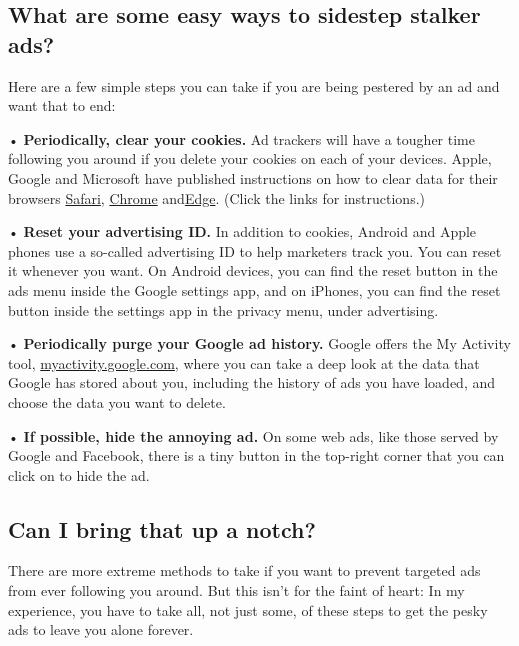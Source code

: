 \hypertarget{what-are-some-easy-ways-to-sidestep-stalker-ads}{%
\subsection{What are some easy ways to sidestep stalker
ads?}\label{what-are-some-easy-ways-to-sidestep-stalker-ads}}

Here are a few simple steps you can take if you are being pestered by an
ad and want that to end:

• \textbf{Periodically, clear your cookies.} Ad trackers will have a
tougher time following you around if you delete your cookies on each of
your devices. Apple, Google and Microsoft have published instructions on
how to clear data for their browsers
\href{https://support.apple.com/kb/PH21411?locale=en_US}{Safari},
\href{https://support.google.com/accounts/answer/32050?co=GENIE.Platform\%3DDesktop\&hl=en}{Chrome}
and\href{https://privacy.microsoft.com/en-us/windows-10-microsoft-edge-and-privacy}{Edge}.
(Click the links for instructions.)

• \textbf{Reset your advertising ID.} In addition to cookies, Android
and Apple phones use a so-called advertising ID to help marketers track
you. You can reset it whenever you want. On Android devices, you can
find the reset button in the ads menu inside the Google settings app,
and on iPhones, you can find the reset button inside the settings app in
the privacy menu, under advertising.

• \textbf{Periodically purge your Google ad history.} Google offers the
My Activity tool,
\href{https://myactivity.google.com/}{myactivity.google.com}, where you
can take a deep look at the data that Google has stored about you,
including the history of ads you have loaded, and choose the data you
want to delete.

• \textbf{If possible, hide the annoying ad.} On some web ads, like
those served by Google and Facebook, there is a tiny button in the
top-right corner that you can click on to hide the ad.

\hypertarget{can-i-bring-that-up-a-notch}{%
\subsection{Can I bring that up a
notch?}\label{can-i-bring-that-up-a-notch}}

There are more extreme methods to take if you want to prevent targeted
ads from ever following you around. But this isn't for the faint of
heart: In my experience, you have to take all, not just some, of these
steps to get the pesky ads to leave you alone forever.

